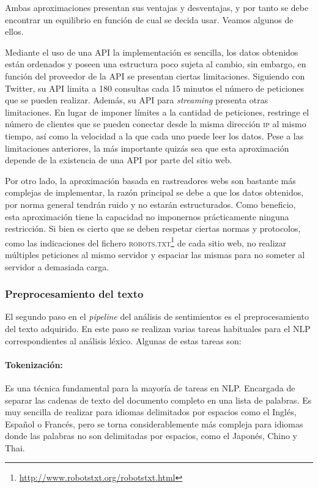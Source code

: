 Ambas aproximaciones presentan sus ventajas y desventajas, y por tanto se debe
encontrar un equilibrio en función de cual se decida usar. Veamos algunos de
ellos.

Mediante el uso de una \ac{API} la implementación es sencilla, los datos
obtenidos están ordenados y poseen una estructura poco sujeta al cambio, sin
embargo, en función del proveedor de la \ac{API} se presentan ciertas
limitaciones. Siguiendo con Twitter, su \ac{API} limita a 180 consultas cada 15
minutos el número de peticiones que se pueden realizar. Además, su \ac{API} para
\emph{streaming} presenta otras limitaciones. En lugar de imponer límites a la
cantidad de peticiones, restringe el número de clientes que se pueden conectar
desde la misma dirección \textsc{ip} al mismo tiempo, así como la velocidad a la
que cada uno puede leer los datos. Pese a las limitaciones anteriores, la más
importante quizás sea que esta aproximación depende de la existencia de una
\ac{API} por parte del sitio web.

Por otro lado, la aproximación basada en rastreadores webs son bastante más
complejas de implementar, la razón principal se debe a que los datos obtenidos,
por norma general tendrán ruido y no estarán estructurados. Como beneficio, esta
aproximación tiene la capacidad no imponernos prácticamente ninguna
restricción. Si bien es cierto que se deben respetar ciertas normas y
protocolos, como las indicaciones del fichero
\textsc{robots.txt}\footnote{\url{http://www.robotstxt.org/robotstxt.html}} de
cada sitio web, no realizar múltiples peticiones al mismo servidor y espaciar
las mismas para no someter al servidor a demasiada carga.

\subsubsection{Preprocesamiento del texto}
\label{sec:textpreprocesing}

El segundo paso en el \emph{pipeline} del análisis de sentimientos es el
preprocesamiento del texto adquirido. En este paso se realizan varias tareas
habituales para el \ac{NLP} correspondientes al análisis léxico. Algunas de
estas tareas son:

\label{par:token}
\paragraph{Tokenización:}Es una técnica fundamental para la mayoría de tareas en
\ac{NLP}. Encargada de separar las cadenas de texto del documento completo en
una lista de palabras. Es muy sencilla de realizar para idiomas delimitados por
espacios como el Inglés, Español o Francés, pero se torna considerablemente más
compleja para idiomas donde las palabras no son delimitadas por espacios, como
el Japonés, Chino y Thai.

